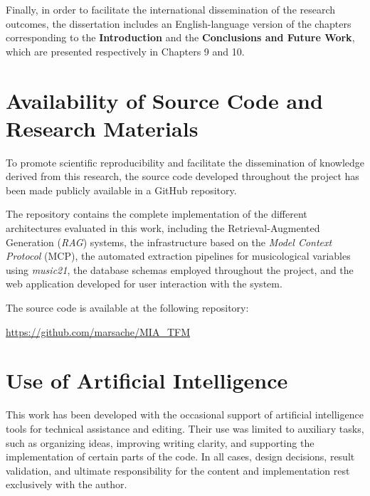 Finally, in order to facilitate the international dissemination of the research outcomes, the dissertation includes an English-language version of the chapters corresponding to the \textbf{Introduction} and the \textbf{Conclusions and Future Work}, which are presented respectively in Chapters 9 and 10.

\section{Availability of Source Code and Research Materials}

To promote scientific reproducibility and facilitate the dissemination of knowledge derived from this research, the source code developed throughout the project has been made publicly available in a GitHub repository.

The repository contains the complete implementation of the different architectures evaluated in this work, including the Retrieval-Augmented Generation (\textit{RAG}) systems, the infrastructure based on the \textit{Model Context Protocol} (MCP), the automated extraction pipelines for musicological variables using \textit{music21}, the database schemas employed throughout the project, and the web application developed for user interaction with the system.

The source code is available at the following repository:

\begin{center}
\url{https://github.com/marsache/MIA_TFM}
\end{center}

\section{Use of Artificial Intelligence}
This work has been developed with the occasional support of artificial intelligence tools for technical assistance and editing. Their use was limited to auxiliary tasks, such as organizing ideas, improving writing clarity, and supporting the implementation of certain parts of the code. In all cases, design decisions, result validation, and ultimate responsibility for the content and implementation rest exclusively with the author.